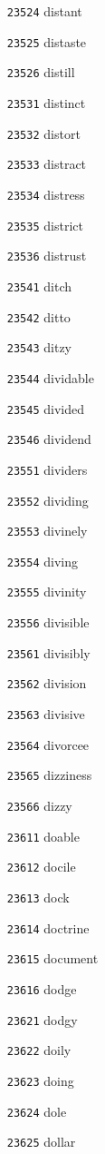 \documentclass[twoside,11pt]{article}
\begin{document}
\begin{multicols}{5}
\begin{enumerate}
\item[\texttt{23524}] distant
\item[\texttt{23525}] distaste
\item[\texttt{23526}] distill
\item[\texttt{23531}] distinct
\item[\texttt{23532}] distort
\item[\texttt{23533}] distract
\item[\texttt{23534}] distress
\item[\texttt{23535}] district
\item[\texttt{23536}] distrust
\item[\texttt{23541}] ditch
\item[\texttt{23542}] ditto
\item[\texttt{23543}] ditzy
\item[\texttt{23544}] dividable
\item[\texttt{23545}] divided
\item[\texttt{23546}] dividend
\item[\texttt{23551}] dividers
\item[\texttt{23552}] dividing
\item[\texttt{23553}] divinely
\item[\texttt{23554}] diving
\item[\texttt{23555}] divinity
\item[\texttt{23556}] divisible
\item[\texttt{23561}] divisibly
\item[\texttt{23562}] division
\item[\texttt{23563}] divisive
\item[\texttt{23564}] divorcee
\item[\texttt{23565}] dizziness
\item[\texttt{23566}] dizzy
\item[\texttt{23611}] doable
\item[\texttt{23612}] docile
\item[\texttt{23613}] dock
\item[\texttt{23614}] doctrine
\item[\texttt{23615}] document
\item[\texttt{23616}] dodge
\item[\texttt{23621}] dodgy
\item[\texttt{23622}] doily
\item[\texttt{23623}] doing
\item[\texttt{23624}] dole
\item[\texttt{23625}] dollar

\end{enumerate}
\end{multicols}
\end{document}
